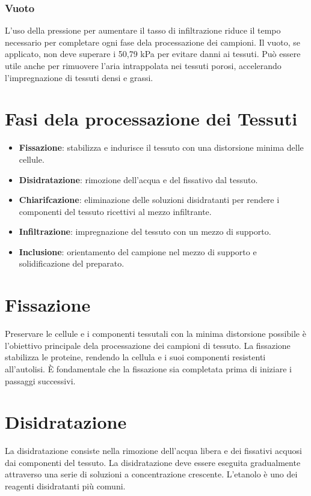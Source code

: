 \subsubsection{Vuoto}
L'uso della pressione per aumentare il tasso di infiltrazione riduce il tempo necessario per completare ogni fase dela processazione dei campioni. Il vuoto, se applicato, non deve superare i 50,79 kPa per evitare danni ai tessuti. Può essere utile anche per rimuovere l'aria intrappolata nei tessuti porosi, accelerando l'impregnazione di tessuti densi e grassi.

\section{Fasi dela processazione dei Tessuti}
\begin{itemize}
    \item \textbf{Fissazione}: stabilizza e indurisce il tessuto con una distorsione minima delle cellule.
    \item \textbf{Disidratazione}: rimozione dell'acqua e del fissativo dal tessuto.
    \item \textbf{Chiarifcazione}: eliminazione delle soluzioni disidratanti per rendere i componenti del tessuto ricettivi al mezzo infiltrante.
    \item \textbf{Infiltrazione}: impregnazione del tessuto con un mezzo di supporto.
    \item \textbf{Inclusione}: orientamento del campione nel mezzo di supporto e solidificazione del preparato.
\end{itemize}

\section{Fissazione}
Preservare le cellule e i componenti tessutali con la minima distorsione possibile è l'obiettivo principale dela processazione dei campioni di tessuto. La fissazione stabilizza le proteine, rendendo la cellula e i suoi componenti resistenti all'autolisi. È fondamentale che la fissazione sia completata prima di iniziare i passaggi successivi.

\section{Disidratazione}
La disidratazione consiste nella rimozione dell'acqua libera e dei fissativi acquosi dai componenti del tessuto. La disidratazione deve essere eseguita gradualmente attraverso una serie di soluzioni a concentrazione crescente. L'etanolo è uno dei reagenti disidratanti più comuni.


